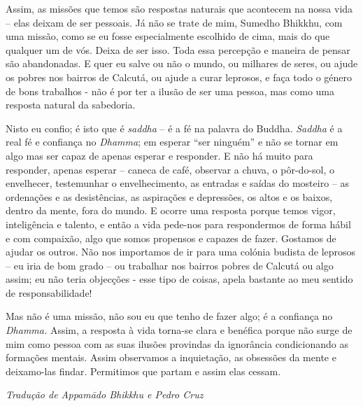 Assim, as missões que temos são respostas naturais que acontecem na
nossa vida -- elas deixam de ser pessoais. Já não se trate de mim,
Sumedho Bhikkhu, com uma missão, como se eu fosse especialmente
escolhido de cima, mais do que qualquer um de vós. Deixa de ser isso.
Toda essa percepção e maneira de pensar são abandonadas. E quer eu salve
ou não o mundo, ou milhares de seres, ou ajude os pobres nos bairros de
Calcutá, ou ajude a curar leprosos, e faça todo o género de bons
trabalhos - não é por ter a ilusão de ser uma pessoa, mas como uma
resposta natural da sabedoria.

Nisto eu confio; é isto que é \emph{saddha} -- é a fé na palavra do
Buddha. \emph{Saddha} é a real fé e confiança no \emph{Dhamma}; em
esperar ``ser ninguém'' e não se tornar em algo mas ser capaz de apenas
esperar e responder. E não há muito para responder, apenas esperar --
caneca de café, observar a chuva, o pôr-do-sol, o envelhecer,
testemunhar o envelhecimento, as entradas e saídas do mosteiro -- as
ordenações e as desistências, as aspirações e depressões, os altos e os
baixos, dentro da mente, fora do mundo. E ocorre uma resposta porque
temos vigor, inteligência e talento, e então a vida pede-nos para
respondermos de forma hábil e com compaixão, algo que somos propensos e
capazes de fazer. Gostamos de ajudar os outros. Não nos importamos de ir
para uma colónia budista de leprosos -- eu iria de bom grado -- ou
trabalhar nos bairros pobres de Calcutá ou algo assim; eu não teria
objecções - esse tipo de coisas, apela bastante ao meu sentido de
responsabilidade!

Mas não é uma missão, não sou eu que tenho de fazer algo; é a confiança
no \emph{Dhamma.} Assim, a resposta à vida torna-se clara e benéfica
porque não surge de mim como pessoa com as suas ilusões provindas da
ignorância condicionando as formações mentais. Assim observamos a
inquietação, as obsessões da mente e deixamo-las findar. Permitimos que
partam e assim elas cessam.

\bigskip

{\raggedleft\itshape
  Tradução de Appamādo Bhikkhu e Pedro Cruz
\par}
